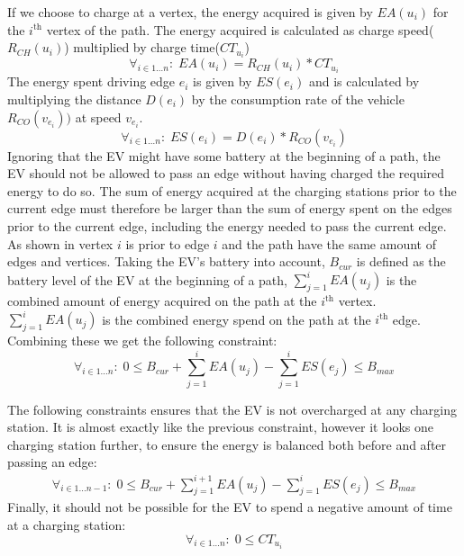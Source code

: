 If we choose to charge at a vertex, the energy acquired is given by $EA(u_i)$ for the $i^{\text{th}}$ vertex of the path. The energy acquired is calculated as charge speed($R_{CH}(u_i)$) multiplied by charge time($CT_{u_i}$)
\begin{equation*}
\forall_{i\in1 \dots n }:\; EA(u_i) = R_{CH}(u_i) * CT_{u_i}
\end{equation*}
The energy spent driving edge $e_i$ is given by $ES(e_i)$ and is calculated by multiplying the distance $D(e_i)$ by the consumption rate of the vehicle $R_{CO}(v_{e_i}))$ at speed $v_{e_i}$.
\begin{equation*}
\forall_{i\in1 \dots n }:\; ES(e_i) = D(e_i)*R_{CO}(v_{e_i})
\end{equation*}
Ignoring that the EV might have some battery at the beginning of a path, the EV should not be allowed to pass an edge without having charged the required energy to do so. The sum of energy acquired at the charging stations prior to the current edge must therefore be larger than the sum of energy spent on the edges prior to the current edge, including the energy needed to pass the current edge. As shown in  vertex $i$ is prior to edge $i$ and the path have the same amount of edges and vertices. Taking the EV's battery into account, $B_{cur}$ is defined as the battery level of the EV at the beginning of a path, $ \sum_{j=1}^{i} EA(u_j)$ is the combined amount of energy acquired on the path at the $i^{\text{th}}$ vertex. $\sum_{j=1}^{i} EA(u_j)$ is the combined energy spend on the path at the $i^{\text{th}}$ edge. Combining these we get the following constraint:
\begin{equation*}
\forall_{i\in1 \dots n }:\;0 \leq B_{cur} + \sum_{j=1}^{i} EA(u_j) - \sum_{j=1}^{i} ES(e_j) \leq B_{max}
\end{equation*}\label{eq:energyreq}

The following constraints ensures that the EV is not overcharged at any charging station. It is almost exactly like the previous constraint, however it looks one charging station further, to ensure the energy is balanced both before and after passing an edge:
\begin{equation*}
\begin{aligned}
\forall_{i\in1 \dots n-1}:\;0 \leq B_{cur} + \sum_{j=1}^{i+1} EA(u_j) - \sum_{j=1}^{i} ES(e_j) \leq B_{max}
\end{aligned}
\end{equation*}
Finally, it should not be possible for the EV to spend a negative amount of time at a charging station:
\begin{equation*}
\forall_{i\in1 \dots n }:\; 0 \leq CT_{u_i}
\end{equation*}
